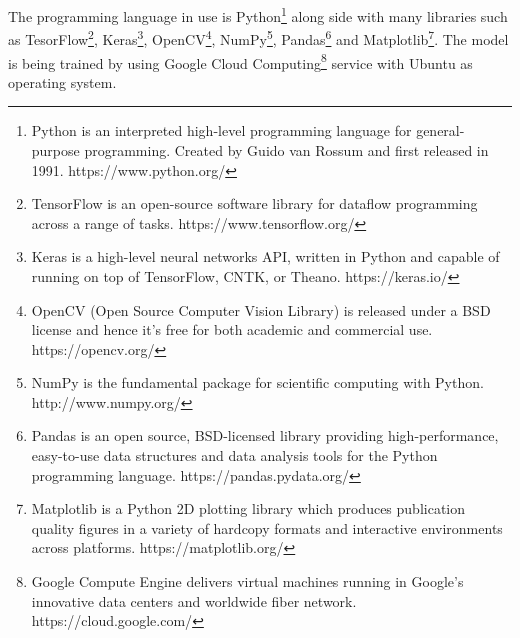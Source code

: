 \documentclass[12pt]{report}
\begin{document}
The programming language in use is Python\footnote{Python is an interpreted high-level programming language for general-purpose programming. Created by Guido van Rossum and first released in 1991. https://www.python.org/} along side with many
libraries such as TesorFlow\footnote{TensorFlow is an open-source software library for dataflow programming across a range of tasks. https://www.tensorflow.org/},
Keras\footnote{Keras is a high-level neural networks API, written in Python and capable of running on top of TensorFlow, CNTK, or Theano. https://keras.io/}, 
OpenCV\footnote{OpenCV (Open Source Computer Vision Library) is released under a BSD license and hence it’s free for both academic and commercial use. https://opencv.org/}, 
NumPy\footnote{NumPy is the fundamental package for scientific computing with Python. http://www.numpy.org/}, 
Pandas\footnote{Pandas is an open source, BSD-licensed library providing high-performance, easy-to-use data structures and data analysis tools for the Python programming language. https://pandas.pydata.org/}
and Matplotlib\footnote{Matplotlib is a Python 2D plotting library which produces publication quality figures in a variety of hardcopy formats and interactive environments across platforms. https://matplotlib.org/}.
The model is being trained by using Google Cloud Computing\footnote{Google Compute Engine delivers virtual machines running in Google's innovative data centers and worldwide fiber network. https://cloud.google.com/} service with Ubuntu as operating system.


\renewcommand\bibname{References}            

\end{document}
